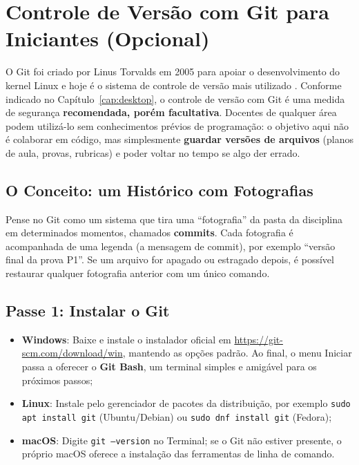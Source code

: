 \chapter{Controle de Vers{\~a}o com Git para Iniciantes (Opcional)}
\label{ap:git}

O Git foi criado por Linus Torvalds em 2005 para apoiar o desenvolvimento do kernel Linux e hoje {\'e} o sistema de controle de vers{\~a}o mais utilizado \cite{chacon2014progit}. Conforme indicado no Cap{\'i}tulo~\ref{cap:desktop}, o controle de vers{\~a}o com Git {\'e} uma medida de seguran{\c c}a \textbf{recomendada, por{\'e}m facultativa}. Docentes de qualquer {\'a}rea podem utiliz{\'a}-lo sem conhecimentos pr{\'e}vios de programa{\c c}{\~a}o: o objetivo aqui n{\~a}o {\'e} colaborar em c{\'o}digo, mas simplesmente \textbf{guardar vers{\~o}es de arquivos} (planos de aula, provas, rubricas) e poder voltar no tempo se algo der errado.

\section{O Conceito: um Hist{\'o}rico com Fotografias}

Pense no Git como um sistema que tira uma ``fotografia'' da pasta da disciplina em determinados momentos, chamados \textbf{commits}. Cada fotografia {\'e} acompanhada de uma legenda (a mensagem de commit), por exemplo ``vers{\~a}o final da prova P1''. Se um arquivo for apagado ou estragado depois, {\'e} poss{\'i}vel restaurar qualquer fotografia anterior com um {\'u}nico comando.

\section{Passe 1: Instalar o Git}

\begin{itemize}
  \item \textbf{Windows}: Baixe e instale o instalador oficial em \url{https://git-scm.com/download/win}, mantendo as op{\c c}{\~o}es padr{\~a}o. Ao final, o menu Iniciar passa a oferecer o \textbf{Git Bash}, um terminal simples e amig{\'a}vel para os pr{\'o}ximos passos;
  \item \textbf{Linux}: Instale pelo gerenciador de pacotes da distribui{\c c}{\~a}o, por exemplo \texttt{sudo apt install git} (Ubuntu/Debian) ou \texttt{sudo dnf install git} (Fedora);
  \item \textbf{macOS}: Digite \texttt{git --version} no Terminal; se o Git n{\~a}o estiver presente, o pr{\'o}prio macOS oferece a instala{\c c}{\~a}o das ferramentas de linha de comando.
\end{itemize}

